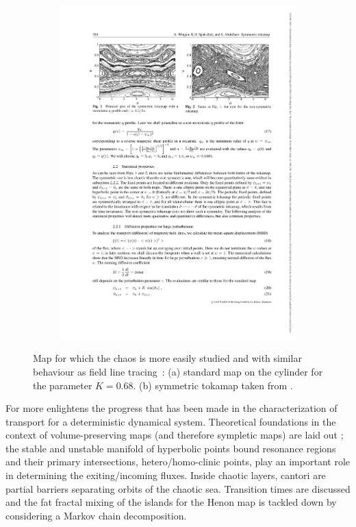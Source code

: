 \begin{figure}[h!]
\begin{subfigure}[t]{0.56\textwidth}
        \includegraphics[width=\textwidth]{images/intro/tokamap.pdf}
        \caption{}
        \label{fig:tokamap}
    \end{subfigure}
    \caption{Map for which the chaos is more easily studied and with similar behaviour as field line tracing~: (a) standard map on the cylinder for the parameter $K=0.68$. (b) symmetric tokamap taken from \cite{wingen_stochastic_2005}.}
    \label{fig:mapping-the-chaos}
\end{figure}

For more 
\cite{meiss_thirty_2015} enlightens the progress that has been made in the characterization of transport for a deterministic dynamical system. Theoretical foundations in the context of volume-preserving maps (and therefore sympletic maps) are laid out ; the stable and unstable manifold of hyperbolic points bound resonance regions and their primary intersections, hetero/homo-clinic points, play an important role in determining the exiting/incoming fluxes. Inside chaotic layers, cantori are partial barriers separating orbits of the chaotic sea. Transition times are discussed and the fat fractal mixing of the islands for the Henon map is tackled down by considering a Markov chain decomposition.

